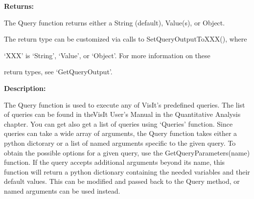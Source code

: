 \documentclass[letterpaper,10pt,english]{sphinxmanual}
\begin{document}
\begin{DUlineblock}{0em}
\item[] 
\item[] \textbf{Returns:}
\item[] The Query function returns either a String (default), Value(s), or Object.
\item[] The return type can be customized via calls to SetQueryOutputToXXX(), where
\item[] `XXX' is `String', `Value', or `Object'. For more information on these
\item[] return types, see `GetQueryOutput'.
\item[] 
\item[] \textbf{Description:}
\item[] The Query function is used to execute any of VisIt's predefined queries.
The list of queries can be found in theVisIt User's Manual in the
Quantitative Analysis chapter. You can get also get a list of queries
using `Queries' function.
Since queries can take a wide array of arguments, the Query function takes
either a python dictorary or a list of named arguments specific to the
given query.  To obtain the possible options for a given query, use the
GetQueryParameters(name) function.  If the query accepts additional
arguments beyond its name, this function will return a python dictionary
containing the needed variables and their default values.  This can be
modified and passed back to the Query method, or named arguments can be
used instead.
\end{DUlineblock}

\begin{DUlineblock}{0em}
\item[] 
\end{DUlineblock}
\end{document}
